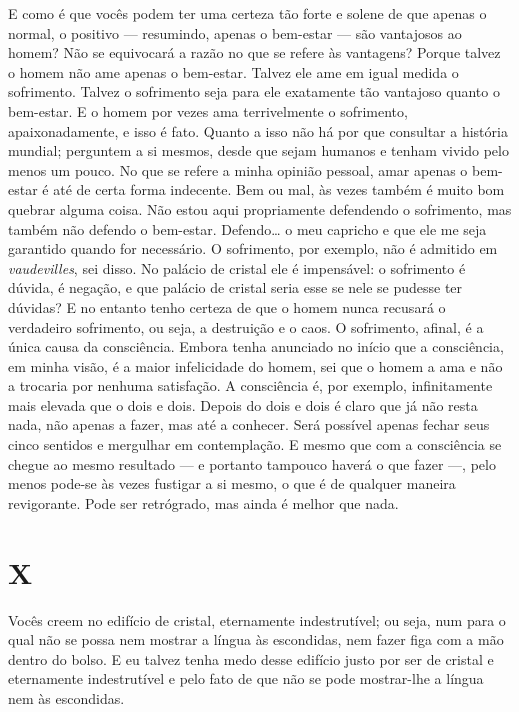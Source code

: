 E como é que vocês podem ter uma certeza tão forte e solene de que
apenas o normal, o positivo --- resumindo, apenas o bem-estar --- são
vantajosos ao homem? Não se equivocará a razão no que se refere às
vantagens? Porque talvez o homem não ame apenas o bem-estar. Talvez ele
ame em igual medida o sofrimento. Talvez o sofrimento seja para ele
exatamente tão vantajoso quanto o bem-estar. E o homem por vezes ama
terrivelmente o sofrimento, apaixonadamente, e isso é fato. Quanto a
isso não há por que consultar a história mundial; perguntem a si
mesmos, desde que sejam humanos e tenham vivido pelo menos um pouco. No
que se refere a minha opinião pessoal, amar apenas o bem-estar é até de
certa forma indecente. Bem ou mal, às vezes também é muito bom quebrar
alguma coisa. Não estou aqui propriamente defendendo o sofrimento, mas
também não defendo o bem-estar. Defendo\ldots{} o meu capricho e que ele me
seja garantido quando for necessário. O sofrimento, por exemplo, não é
admitido em \textit{vaudevilles}, sei disso. No palácio de cristal ele
é impensável: o sofrimento é dúvida, é negação, e que palácio de
cristal seria esse se nele se pudesse ter dúvidas? E no entanto tenho
certeza de que o homem nunca recusará o verdadeiro sofrimento, ou seja,
a destruição e o caos. O sofrimento, afinal, é a única causa da
consciência. Embora tenha anunciado no início que a consciência, em
minha visão, é a maior infelicidade do homem, sei que o homem a ama e
não a trocaria por nenhuma satisfação. A consciência é, por exemplo,
infinitamente mais elevada que o dois e dois. Depois do dois e dois é
claro que já não resta nada, não apenas a fazer, mas até a conhecer.
Será possível apenas fechar seus cinco sentidos e mergulhar em
contemplação. E mesmo que com a consciência se chegue ao mesmo
resultado --- e portanto tampouco haverá o que fazer ---, pelo menos
pode-se às vezes fustigar a si mesmo, o que é de qualquer maneira
revigorante. Pode ser retrógrado, mas ainda é melhor que nada.


\section{X}

Vocês creem no edifício de cristal, eternamente indestrutível; ou seja,
num para o qual não se possa nem mostrar a língua às escondidas, nem
fazer figa com a mão dentro do bolso. E eu talvez tenha medo desse
edifício justo por ser de cristal e eternamente indestrutível e pelo
fato de que não se pode mostrar-lhe a língua nem às escondidas.

